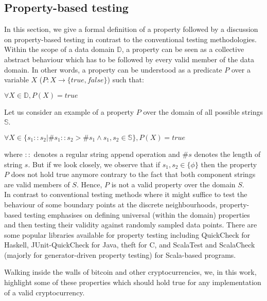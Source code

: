 
\newcommand{\avector}[2]{(#1_1,#1_2,\ldots,#1_{#2})}
\newcommand{\aDEFvector}[2][a]{(#1_1,#1_2,\ldots,#1_{#2})}

\subsection{Property-based testing}
In this section, we give a formal definition of a property followed by a discussion on property-based testing in contrast to the conventional testing methodologies.\\
Within the scope of a data domain $\mathbb{D}$, a property can be seen as a collective abstract behaviour which has to be followed by every valid member of the data domain. In other words, a property can be understood as a predicate $P$ over a variable $X$ ($P:X \rightarrow \{true, false\}$) such that: 
\begin{center}
$\forall X \in \mathbb{D}, P(X) = true$
\end{center}
Let us consider an example of a property $P$ over the domain of all possible strings $\mathbb{S}$.
\begin{center}
$\forall X \in \{s_1::s_2 | \#s_1::s_2 >  \#s_1 \wedge s_1, s_2 \in \mathbb{S}\}, P(X) = true$
\end{center}
where $::$ denotes a regular string append operation and $\#s$ denotes the length of string $s$. But if we look closely, we observe that if $s_1, s_2 \in \{\phi\}$ then the property $P$ does not hold true anymore contrary to the fact that both component strings are valid members of $S$. Hence, $P$ is not a valid property over the domain $S$. \\
In contrast to conventional testing methods where it might suffice to test the behaviour of some boundary points at the discrete neighbourhoods, property-based testing emphasises on defining universal (within the domain) properties and then testing their validity against randomly sampled data points. There are some popular libraries available for property testing including QuickCheck for Haskell, JUnit-QuickCheck for Java, theft for C, and ScalaTest and ScalaCheck (majorly for generator-driven property testing) for Scala-based programs. 

Walking inside the walls of bitcoin and other cryptocurrencies, we, in this work, highlight some of these properties which should hold true for any implementation of a valid cryptocurrency.